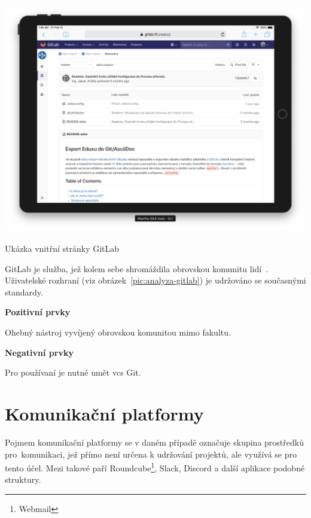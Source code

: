 \begin{fig:illustration}
   \includegraphics[width=1\textwidth]{images/analyza-gitlab.png}
   \caption{Ukázka vnitřní stránky GitLab}\label{pic:analyza-gitlab}
\end{fig:illustration}
\clearpage
GitLab je služba, jež kolem sebe shromáždila obrovskou komunitu lidí~\cite{gitlabSource}. Uživatelské rozhraní (viz obrázek~\ref{pic:analyza-gitlab}) je udržováno se současnými standardy.

\textbf{Pozitivní prvky}
\begin{ul}
\tightlist
   \item Ohebný nástroj vyvíjený obrovskou komunitou mimo fakultu.
\end{ul}

\textbf{Negativní prvky}
\begin{ul}
   \item Pro používaní je nutné umět \gls{vcs} Git.
\end{ul}




\section{Komunikační platformy}

Pojmem komunikační platformy se v daném případě označuje skupina prostředků pro~komunikaci, jež přímo není určena k udržování projektů, ale využívá se pro tento účel. Mezi takové paří Roundcube\footnote{Webmail}, Slack, Discord a další aplikace podobné struktury.

